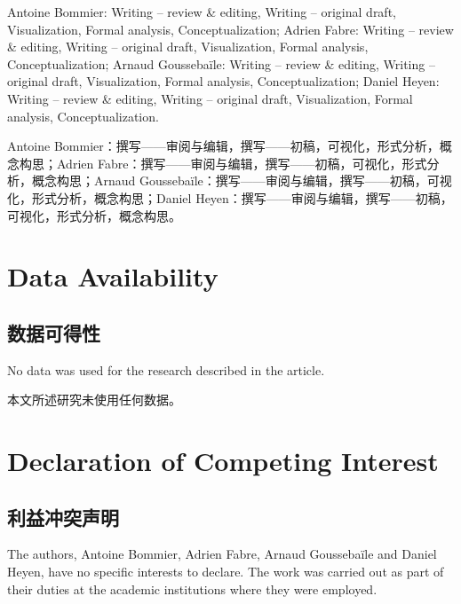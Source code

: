 \documentclass[12pt,a4paper]{article}
\newenvironment{original}
  {\par\noindent\ignorespaces}
  {\par}
\newenvironment{translation}
  {\par\noindent{\color{transblue}\ignorespaces}}
  {\par\medskip}
\begin{document}
\begin{original}
Antoine Bommier: Writing -- review \& editing, Writing -- original draft, Visualization, Formal analysis, Conceptualization; Adrien Fabre: Writing -- review \& editing, Writing -- original draft, Visualization, Formal analysis, Conceptualization; Arnaud Gousseba\"{i}le: Writing -- review \& editing, Writing -- original draft, Visualization, Formal analysis, Conceptualization; Daniel Heyen: Writing -- review \& editing, Writing -- original draft, Visualization, Formal analysis, Conceptualization.
\end{original}

\begin{translation}
Antoine Bommier：撰写——审阅与编辑，撰写——初稿，可视化，形式分析，概念构思；Adrien Fabre：撰写——审阅与编辑，撰写——初稿，可视化，形式分析，概念构思；Arnaud Gousseba\"{i}le：撰写——审阅与编辑，撰写——初稿，可视化，形式分析，概念构思；Daniel Heyen：撰写——审阅与编辑，撰写——初稿，可视化，形式分析，概念构思。
\end{translation}

\section*{Data Availability}
{\color{transblue}\subsection*{数据可得性}}

\begin{original}
No data was used for the research described in the article.
\end{original}

\begin{translation}
本文所述研究未使用任何数据。
\end{translation}

\section*{Declaration of Competing Interest}
{\color{transblue}\subsection*{利益冲突声明}}

\begin{original}
The authors, Antoine Bommier, Adrien Fabre, Arnaud Gousseba\"{i}le and Daniel Heyen, have no specific interests to declare. The work was carried out as part of their duties at the academic institutions where they were employed.
\end{original}
\end{document}
